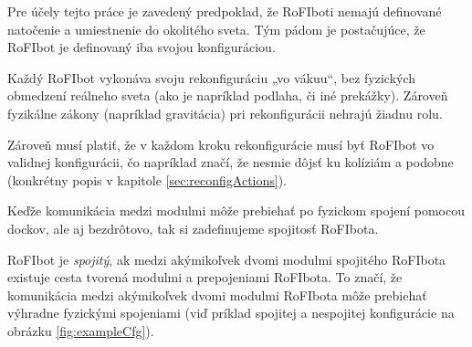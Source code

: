 \documentclass[
  digital, %
  twoside, %
  table,   %
  nolof,     %
  nolot,     %
]{fithesis3}
\begin{document}
Pre účely tejto práce je zavedený predpoklad, že RoFIboti nemajú definované natočenie a umiestnenie do okolitého sveta. Tým pádom je postačujúce, že RoFIbot je definovaný iba svojou konfiguráciou. 

Každý RoFIbot vykonáva svoju rekonfiguráciu „vo vákuu“, bez fyzických obmedzení reálneho sveta (ako je napríklad podlaha, či iné prekážky). Zároveň fyzikálne zákony (napríklad gravitácia) pri rekonfigurácii nehrajú žiadnu rolu. 

Zároveň musí platiť, že v každom kroku rekonfigurácie musí byť RoFIbot vo validnej konfigurácii, čo napríklad značí, že nesmie dôjsť ku kolíziám a podobne (konkrétny popis v kapitole \ref{sec:reconfigActions}). 

Keďže komunikácia medzi modulmi môže prebiehať po fyzickom spojení pomocou dockov, ale aj bezdrôtovo, tak si zadefinujeme spojitosť RoFIbota. 

RoFIbot je \textit{spojitý}, ak medzi akýmikoľvek dvomi modulmi spojitého RoFIbota existuje cesta tvorená modulmi a prepojeniami RoFIbota. To značí, že komunikácia medzi akýmikoľvek dvomi modulmi RoFIbota môže prebiehať výhradne fyzickými spojeniami (viď príklad spojitej a nespojitej konfigurácie na obrázku \ref{fig:exampleCfg}). 
\end{document}
